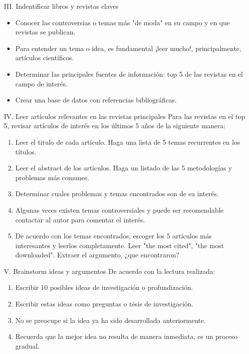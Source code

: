 \documentclass [xcolor=svgnames, t] {beamer}
\begin{document}
\begin{frame}{III. Indentificar libros y revistas claves}
\begin{itemize}
\item Conocer las controversias o temas m\'as "de moda" en su campo y en que revistas se publican. 
\item Para entender un tema o idea, es fundamental ¡leer mucho!, principalmente, art\'iculos cient\'ificos.
\item Determinar las principales fuentes de informaci\'on: top 5 de las revistas en el campo de inter\'es.
\item Crear una base de datos con referencias bibliogr\'aficas. 
\end{itemize}
\end{frame}

\begin{frame}{IV. Leer art\'iculos relevantes en las revistas principales}
Para las revistas en el top 5, revisar art\'iculos de  inter\'es en los \'ultimos 5 a\~nos de la siguiente manera:
\begin{enumerate}
\item Leer el titulo de cada art\'iculo. Haga una lista de 5 temas recurrentes en los t\'itulos.
\item Leer el abstract de los art\'iculos. Haga un listado de las 5 metodolog\'ias y problemas m\'as comunes. 
\item Determinar cuales problemas y temas encontrados son de su inter\'es.
\item Algunas veces existen temas controversiales y puede ser recomendable contactar al autor para comentar el inter\'es. 
\item De acuerdo con los temas encontrados, escoger los 5 art\'iculos m\'as interesantes y leerlos completamente. Leer "the most cited", "the most downloaded". Extraer el argumento, ¿que encontraron?
\end{enumerate}
\end{frame}


\begin{frame}{V. Brainstorm ideas y argumentos}
De acuerdo con la lectura realizada:
\begin{enumerate}
\item Escribir 10 posibles ideas de investigaci\'on o profundizaci\'on.
\item Escribir estas ideas como preguntas o t\'esis de investigaci\'on.
\item No se preocupe si la idea ya ha sido desarrollada anteriormente.
\item Recuerda que la mejor idea no resulta de manera inmediata, es un proceso gradual.
\end{enumerate}
\end{frame}
\end{document}
